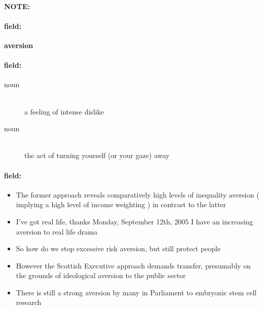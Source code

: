 \documentclass[12pt]{article}
\newenvironment{note}{\paragraph{NOTE:}}{}
\newenvironment{field}{\paragraph{field:}}{}
\begin{document}
\begin{note}
\begin{field}
\textbf{\large aversion}
\end{field}


\begin{field}
\begin{description}
\item[noun] \hfill \\ 
a feeling of intense dislike

\item[noun] \hfill \\ 
the act of turning yourself (or your gaze) away

\end{description}
\end{field}

\begin{field}
\begin{itemize}
\item The former approach reveals comparatively high levels of inequality aversion ( implying a high level of income weighting ) in contrast to the latter
\item I've got real life, thanks Monday, September 12th, 2005 I have an increasing aversion to real life drama 
\item So how do we stop excessive risk aversion, but still protect people
\item However the Scottish Executive approach demands transfer, presumably on the grounds of ideological aversion to the public sector
\item There is still a strong aversion by many in Parliament to embryonic stem cell research
\end{itemize}
\end{field}
\end{note}
\end{document}
